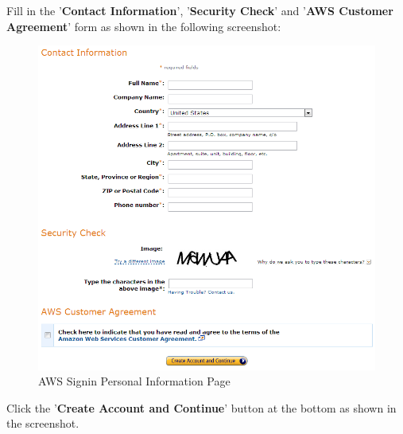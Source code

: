 Fill in the '\textbf{Contact Information}', '\textbf{Security Check}' and '\textbf{AWS Customer Agreement}' form as shown in the following screenshot:
\begin{figure}[ht]
  \centering
  \includegraphics[width=.8\textwidth]{figs/5163os_08_03.png}
  \caption{AWS Signin Personal Information Page}\label{fig:aws.personal.info}
\end{figure} 
Click the '\textbf{Create Account and Continue}' button at the bottom as shown in the screenshot.

